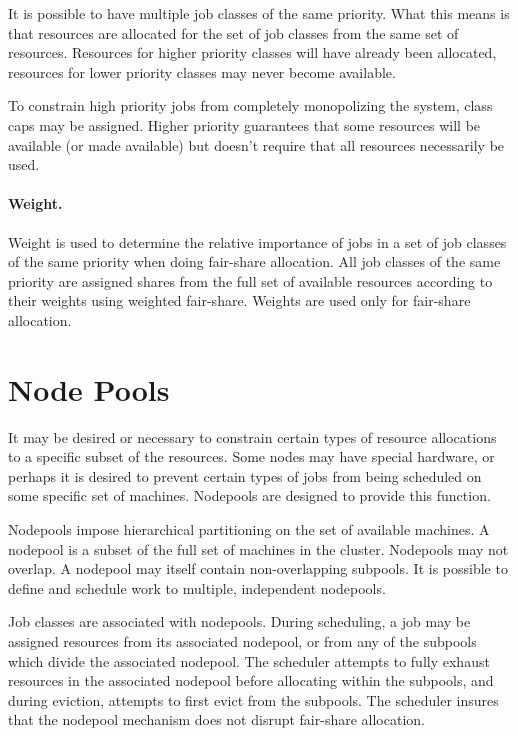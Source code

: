     It is possible to have multiple job classes of the same priority. What this means is that resources 
    are allocated for the set of job classes from the same set of resources. Resources for higher priority 
    classes will have already been allocated, resources for lower priority classes may never become 
    available. 
    
    To constrain high priority jobs from completely monopolizing the system, class caps may be 
    assigned. Higher priority guarantees that some resources will be available (or made available) but 
    doesn't require that all resources necessarily be used. 

    \paragraph{Weight.} Weight is used to determine the relative importance of jobs in a set of job classes of 
    the same priority when doing fair-share allocation. All job classes of the same priority are assigned 
    shares from the full set of available resources according to their weights using weighted fair-share. 
    Weights are used only for fair-share allocation. 
    
    \section{Node Pools}
    It may be desired or necessary to constrain certain types of resource allocations to a specific
    subset of the resources. Some nodes may have special hardware, or perhaps it is desired to
    prevent certain types of jobs from being scheduled on some specific set of machines. Nodepools
    are designed to provide this function.

    Nodepools impose hierarchical partitioning on the set of available machines. A nodepool is a
    subset of the full set of machines in the cluster. Nodepools may not overlap. A nodepool may
    itself contain non-overlapping subpools.  It is possible to define and schedule work to
    multiple, independent nodepools.

    Job classes are associated with nodepools. During scheduling, a job may be assigned resources
    from its associated nodepool, or from any of the subpools which divide the associated nodepool.
    The scheduler attempts to fully exhaust resources in the associated nodepool before allocating
    within the subpools, and during eviction, attempts to first evict from the subpools. The
    scheduler insures that the nodepool mechanism does not disrupt fair-share allocation.
    

